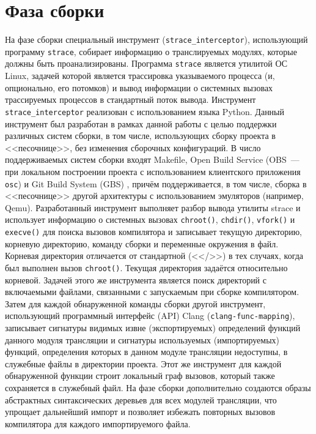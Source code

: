 \section{Фаза сборки}

На фазе сборки специальный инструмент (\texttt{strace\_interceptor}), использующий программу \texttt{strace}, собирает информацию о транслируемых модулях, которые должны быть проанализированы. Программа \texttt{strace} является утилитой ОС Linux, задачей которой является трассировка указываемого процесса (и, опционально, его потомков) и вывод информации о системных вызовах трассируемых процессов в стандартный поток вывода. Инструмент \texttt{strace\_interceptor} реализован с использованием языка Python. Данный инструмент был разработан в рамках данной работы с целью поддержки различных систем сборки, в том числе, использующих сборку проекта в <<песочнице>>, без изменения сборочных конфигураций. В число поддерживаемых систем сборки входят Makefile, Open Build Service (OBS~--- при локальном построении проекта с использованием клиентского приложения \texttt{osc}) \cite{obs} и Git Build System (GBS) \cite{gbs}, причём поддерживается, в том числе, сборка в <<песочнице>> другой архитектуры с использованием эмуляторов (например, Qemu). Разработанный инструмент выполняет разбор вывода утилиты strace и использует информацию о системных вызовах \texttt{chroot()}, \texttt{chdir()}, \texttt{vfork()} и \texttt{execve()} для поиска вызовов компилятора и записывает текущую директорию, корневую директорию, команду сборки и переменные окружения в файл. Корневая директория отличается от стандартной (<</>>) в тех случаях, когда был выполнен вызов \texttt{chroot()}. Текущая директория задаётся относительно корневой. Задачей этого же инструмента является поиск директорий с включаемыми файлами, связанными с запускаемым при сборке компилятором. Затем для каждой обнаруженной команды сборки другой инструмент, использующий программный интерфейс (API) Clang (\texttt{clang-func-mapping}), записывает сигнатуры видимых извне (экспортируемых) определений функций данного модуля трансляции и сигнатуры используемых (импортируемых) функций, определения которых в данном модуле трансляции недоступны, в служебные файлы в директории проекта. Этот же инструмент для каждой обнаруженной функции строит локальный граф вызовов, который также сохраняется в служебный файл. На фазе сборки дополнительно создаются образы абстрактных синтаксических деревьев для всех модулей трансляции, что упрощает дальнейший импорт и позволяет избежать повторных вызовов компилятора для каждого импортируемого файла.

